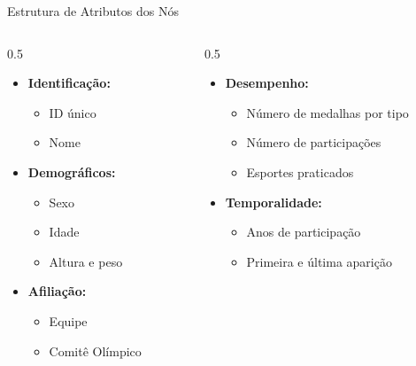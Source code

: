 \begin{frame}{Estrutura de Atributos dos Nós}
\begin{columns}
    \begin{column}{0.5\textwidth}
        \begin{itemize}
            \item \textbf{Identificação:}
            \begin{itemize}
                \item ID único
                \item Nome
            \end{itemize}
            \item \textbf{Demográficos:}
            \begin{itemize}
                \item Sexo
                \item Idade
                \item Altura e peso
            \end{itemize}
            \item \textbf{Afiliação:}
            \begin{itemize}
                \item Equipe
                \item Comitê Olímpico
            \end{itemize}
        \end{itemize}
    \end{column}
    \begin{column}{0.5\textwidth}
        \begin{itemize}
            \item \textbf{Desempenho:}
            \begin{itemize}
                \item Número de medalhas por tipo
                \item Número de participações
                \item Esportes praticados
            \end{itemize}
            \item \textbf{Temporalidade:}
            \begin{itemize}
                \item Anos de participação
                \item Primeira e última aparição
            \end{itemize}
        \end{itemize}
    \end{column}
\end{columns}
\end{frame}